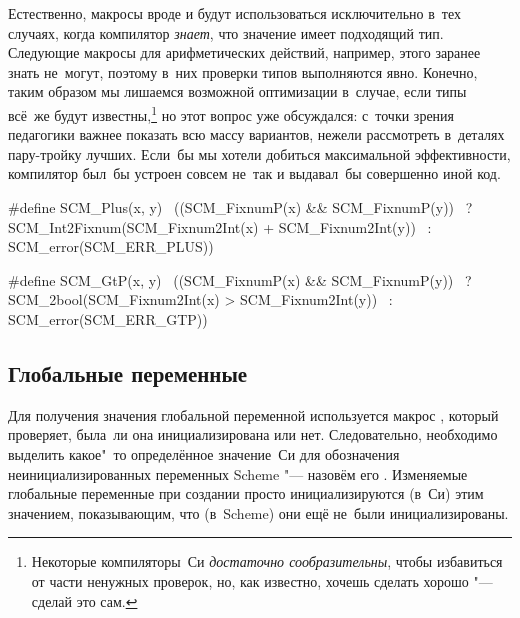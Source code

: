 Естественно, макросы вроде  и  будут использоваться
исключительно в~тех случаях, когда компилятор \emph{знает}, что значение имеет
подходящий тип. Следующие макросы для арифметических действий, например, этого
заранее знать не~могут, поэтому в~них проверки типов выполняются явно. Конечно,
таким образом мы лишаемся возможной оптимизации в~случае, если типы всё~же
будут известны,\footnote*{Некоторые компиляторы~Си \emph{достаточно
сообразительны}, чтобы избавиться от части ненужных проверок, но, как известно,
хочешь сделать хорошо "--- сделай это сам.} но этот вопрос уже обсуждался:
с~точки зрения педагогики важнее показать всю массу вариантов, нежели
рассмотреть в~деталях пару-тройку лучших. Если~бы мы хотели добиться
максимальной эффективности, компилятор был~бы устроен совсем не~так и
выдавал~бы совершенно иной код.

\begin{code:c}
#define SCM_Plus(x, y)                                     \
  ((SCM_FixnumP(x) && SCM_FixnumP(y))                      \
   ? SCM_Int2Fixnum(SCM_Fixnum2Int(x) + SCM_Fixnum2Int(y)) \
   : SCM_error(SCM_ERR_PLUS))

#define SCM_GtP(x, y)                                      \
  ((SCM_FixnumP(x) && SCM_FixnumP(y))                      \
   ? SCM_2bool(SCM_Fixnum2Int(x) > SCM_Fixnum2Int(y))      \
   : SCM_error(SCM_ERR_GTP))
\end{code:c}


\subsection{Глобальные переменные}\label{cc/data/ssect:global}

Для получения значения глобальной переменной используется макрос
, который проверяет, была~ли она
инициализирована или нет. Следовательно, необходимо выделить какое"~то
определённое значение~Си для обозначения неинициализированных переменных Scheme
"--- назовём его . Изменяемые
глобальные переменные при создании просто инициализируются (в~Си) этим
значением, показывающим, что (в~Scheme) они ещё не~были инициализированы.

